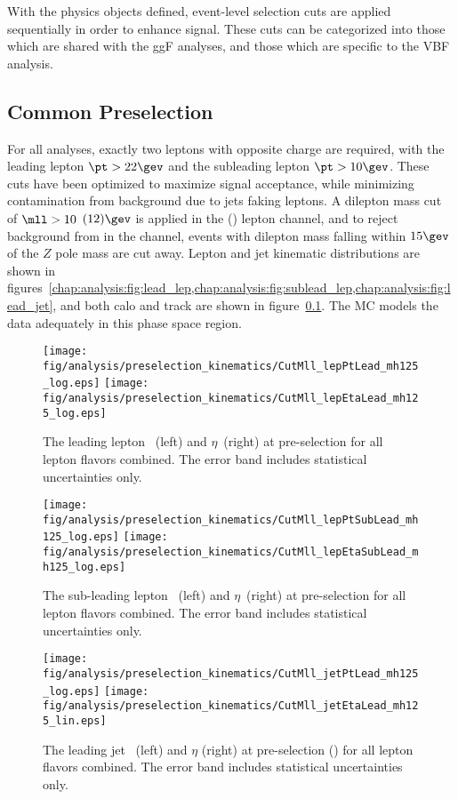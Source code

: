 
With the physics objects defined, event-level selection
cuts are applied sequentially in order to enhance signal. These cuts
can be categorized into those which are shared with the ggF analyses,
and those which are specific to the VBF analysis.

\subsection{Common Preselection}

For all \hwwlnln analyses, exactly two leptons with opposite charge
are required, with the leading lepton $\pt>22 \gev$ and the subleading lepton
$\pt>10 \gev$. These cuts have been optimized to maximize signal
acceptance, while minimizing contamination from background due to jets
faking leptons. A dilepton mass cut of
$\mll> 10$ $(12) \gev$ is applied in the \emme (\eemm) lepton channel,
and to reject background from \ZDY in the \eemm channel, events with dilepton mass falling
within $15 \gev$ of the $Z$ pole mass are cut away. Lepton and jet
kinematic distributions are shown in
figures~\ref{chap:analysis:fig:lead_lep,chap:analysis:fig:sublead_lep,chap:analysis:fig:lead_jet},
and both calo and track \etmiss are shown in figure~\ref{}. The MC models the data
adequately in this phase space region. 

\begin{figure}[h]
\centering
\texttt{[image: fig/analysis/preselection\_kinematics/CutMll\_lepPtLead\_mh125\_log.eps]}
\texttt{[image: fig/analysis/preselection\_kinematics/CutMll\_lepEtaLead\_mh125\_log.eps]}
\caption{The leading lepton \pt~(left) and $\eta$~(right) at
  pre-selection for all lepton flavors combined. The error band
  includes statistical uncertainties only.}
\label{chap:analysis:fig:lead_lep}
\end{figure}

\begin{figure}[h]
\centering
\texttt{[image: fig/analysis/preselection\_kinematics/CutMll\_lepPtSubLead\_mh125\_log.eps]}
\texttt{[image: fig/analysis/preselection\_kinematics/CutMll\_lepEtaSubLead\_mh125\_log.eps]}
\caption{The sub-leading lepton \pt~(left) and $\eta$~(right) at
  pre-selection for all lepton flavors combined. The error band
  includes statistical uncertainties only.}
\label{chap:analysis:fig:sublead_lep}
\end{figure}

\begin{figure}[h]
\centering
\texttt{[image: fig/analysis/preselection\_kinematics/CutMll\_jetPtLead\_mh125\_log.eps]}
\texttt{[image: fig/analysis/preselection\_kinematics/CutMll\_jetEtaLead\_mh125\_lin.eps]}
\caption{The leading jet \pt~(left) and $\eta$ (right) at pre-selection (\mll) for all lepton flavors combined. The
error band includes statistical uncertainties only.}
\label{chap:analysis:fig:lead_jet}
\end{figure}

